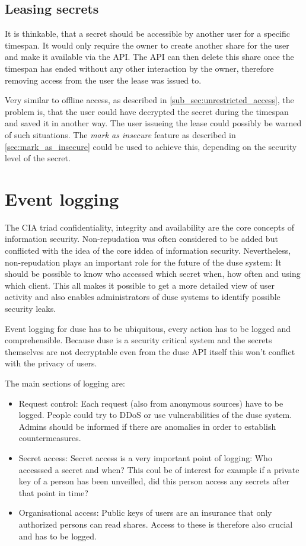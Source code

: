 \subsection{Leasing secrets}
\label{sec:leasing_secrets}

It is thinkable, that a secret should be accessible by another user for a
specific timespan. It would only require the owner to create another share for
the user and make it available via the API. The API can then delete this share
once the timespan has ended without any other interaction by the owner,
therefore removing access from the user the lease was issued to.

Very similar to offline access, as described in
\ref{sub_sec:unrestricted_access}, the problem is, that the user could have
decrypted the secret during the timespan and saved it in another way. The user
issueing the lease could possibly be warned of such situations. The
\textit{mark as insecure} feature as described in \ref{sec:mark_as_insecure}
could be used to achieve this, depending on the security level of the secret.

\section{Event logging}
\label{sec:event_logging}

The CIA triad confidentiality, integrity and availability are the core
concepts of information security. Non-repudation was often considered
to be added but conflicted with the idea of the core iddea of information
security. Nevertheless, non-repudation plays an important role for the
future of the duse system: It should be possible to know who accessed
which secret when, how often and using which client. This all makes it
possible to get a more detailed view of user activity and also enables
administrators of duse systems to identify possible security leaks.

Event logging for duse has to be ubiquitous, every action has to be
logged and comprehensible. Because duse is a security critical system
and the secrets themselves are not decryptable even from the duse API
itself this won't conflict with the privacy of users.

The main sections of logging are:
\begin{itemize}
  \item Request control: Each request (also from anonymous sources) have
  to be logged. People could try to DDoS or use vulnerabilities of the
  duse system. Admins should be informed if there are anomalies in order
  to establish countermeasures.

  \item Secret access: Secret access is a very important point of logging:
  Who accesssed a secret and when? This coul be of interest for example if
  a private key of a person has been unveilled, did this person access any
  secrets after that point in time?

  \item Organisational access: Public keys of users are an insurance that
  only authorized persons can read shares. Access to these is therefore
  also crucial and has to be logged.
\end{itemize}

